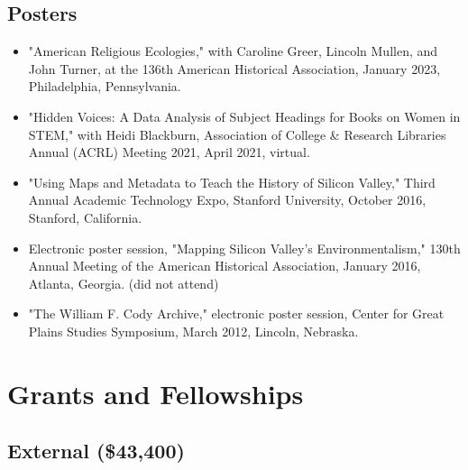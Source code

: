 \documentclass[10pt]{article}
\begin{document}
\subsection*{Posters}

\begin{itemize}
  \item "American Religious Ecologies," with Caroline Greer, Lincoln Mullen, and John Turner, at the 136th American Historical Association, January 2023, Philadelphia, Pennsylvania.
  
  \item "Hidden Voices: A Data Analysis of Subject Headings for Books on Women in STEM," with Heidi Blackburn, Association of College \& Research Libraries Annual (ACRL) Meeting 2021, April 2021, virtual.
  
  \item "Using Maps and Metadata to Teach the History of Silicon Valley," Third Annual Academic Technology Expo, Stanford University, October 2016, Stanford, California.
  
  \item Electronic poster session, "Mapping Silicon Valley's Environmentalism," 130th Annual Meeting of the American Historical Association, January 2016, Atlanta, Georgia. (did not attend)
  
  \item "The William F. Cody Archive," electronic poster session, Center for Great Plains Studies Symposium, March 2012, Lincoln, Nebraska.
\end{itemize}

\section{Grants and Fellowships}

\subsection*{External (\$43,400)}
\end{document}

